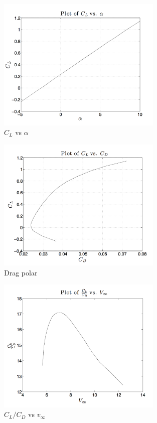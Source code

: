 \documentclass[11pt]{article}
\begin{document}
\begin{figure}[h!]
  \centering
  \includegraphics[width=0.7\textwidth]{Figures/PS3/CL_vs_alpha.png}
  \caption{$C_L$ vs $\alpha$}\label{fig:cl-alpha}
\end{figure}
\begin{figure}[h!]
  \centering
  \includegraphics[width=0.7\textwidth]{Figures/PS3/CL_vs_CD.png}
  \caption{Drag polar}\label{fig:cl-cd}
\end{figure}
\begin{figure}[h!]
  \centering
  \includegraphics[width=0.7\textwidth]{Figures/PS3/CL-CD_vs_V.png}
  \caption{$C_L/C_D$ vs $v_\infty$}\label{fig:LD-v}
\end{figure}
\end{document}
